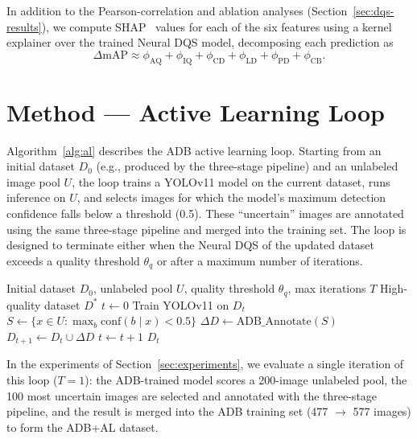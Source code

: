 \documentclass[11pt]{article}
\begin{document}
In addition to the Pearson-correlation and ablation analyses
(Section~\ref{sec:dqs-results}), we compute SHAP~\citep{lundberg2017unified}
values for each of the six features using a kernel explainer over the
trained Neural DQS model, decomposing each prediction as
\begin{equation}
\Delta\mathrm{mAP} \approx \phi_{\mathrm{AQ}} + \phi_{\mathrm{IQ}} + \phi_{\mathrm{CD}} + \phi_{\mathrm{LD}} + \phi_{\mathrm{PD}} + \phi_{\mathrm{CB}}.
\end{equation}

\section{Method --- Active Learning Loop}
\label{sec:al}

Algorithm~\ref{alg:al} describes the ADB active learning loop. Starting from
an initial dataset $D_0$ (e.g., produced by the three-stage pipeline) and an
unlabeled image pool $U$, the loop trains a YOLOv11 model on the current
dataset, runs inference on $U$, and selects images for which the model's
maximum detection confidence falls below a threshold (0.5). These
``uncertain'' images are annotated using the same three-stage pipeline and
merged into the training set. The loop is designed to terminate either when
the Neural DQS of the updated dataset exceeds a quality threshold $\theta_q$
or after a maximum number of iterations.

\begin{algorithm}
\caption{ADB Active Learning Loop}
\label{alg:al}
\begin{algorithmic}[1]
\Require Initial dataset $D_0$, unlabeled pool $U$, quality threshold $\theta_q$, max iterations $T$
\Ensure High-quality dataset $D^*$
\State $t \leftarrow 0$
  \State Train YOLOv11 on $D_t$
  \State $S \leftarrow \{x \in U : \max_b \mathrm{conf}(b \mid x) < 0.5\}$ 
  \State $\Delta D \leftarrow \mathrm{ADB\_Annotate}(S)$ 
  \State $D_{t+1} \leftarrow D_t \cup \Delta D$
  \State $t \leftarrow t + 1$
\EndWhile
\State \Return $D_t$
\end{algorithmic}
\end{algorithm}

In the experiments of Section~\ref{sec:experiments}, we evaluate a single
iteration of this loop ($T=1$): the ADB-trained model scores a 200-image
unlabeled pool, the 100 most uncertain images are selected and annotated with
the three-stage pipeline, and the result is merged into the ADB training set
(477 $\to$ 577 images) to form the ADB+AL dataset.
\end{document}
